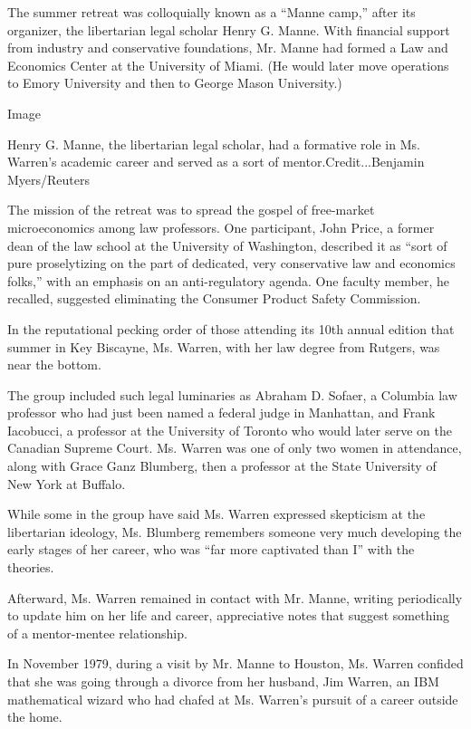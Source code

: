 The summer retreat was colloquially known as a ``Manne camp,'' after its
organizer, the libertarian legal scholar Henry G. Manne. With financial
support from industry and conservative foundations, Mr. Manne had formed
a Law and Economics Center at the University of Miami. (He would later
move operations to Emory University and then to George Mason
University.)

Image

Henry G. Manne, the libertarian legal scholar, had a formative role in
Ms. Warren's academic career and served as a sort of
mentor.Credit...Benjamin Myers/Reuters

The mission of the retreat was to spread the gospel of free-market
microeconomics among law professors. One participant, John Price, a
former dean of the law school at the University of Washington, described
it as ``sort of pure proselytizing on the part of dedicated, very
conservative law and economics folks,'' with an emphasis on an
anti-regulatory agenda. One faculty member, he recalled, suggested
eliminating the Consumer Product Safety Commission.

In the reputational pecking order of those attending its 10th annual
edition that summer in Key Biscayne, Ms. Warren, with her law degree
from Rutgers, was near the bottom.

The group included such legal luminaries as Abraham D. Sofaer, a
Columbia law professor who had just been named a federal judge in
Manhattan, and Frank Iacobucci, a professor at the University of Toronto
who would later serve on the Canadian Supreme Court. Ms. Warren was one
of only two women in attendance, along with Grace Ganz Blumberg, then a
professor at the State University of New York at Buffalo.

While some in the group have said Ms. Warren expressed skepticism at the
libertarian ideology, Ms. Blumberg remembers someone very much
developing the early stages of her career, who was ``far more captivated
than I'' with the theories.

Afterward, Ms. Warren remained in contact with Mr. Manne, writing
periodically to update him on her life and career, appreciative notes
that suggest something of a mentor-mentee relationship.

In November 1979, during a visit by Mr. Manne to Houston, Ms. Warren
confided that she was going through a divorce from her husband, Jim
Warren, an IBM mathematical wizard who had chafed at Ms. Warren's
pursuit of a career outside the home.

